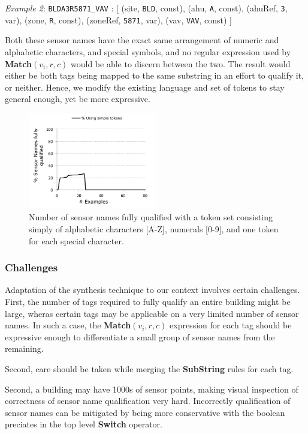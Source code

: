 {\it Example 2}: \texttt{BLDA3R5871\_VAV} : [ (site, \texttt{BLD}, const), (ahu, \texttt{A}, const), (ahuRef, \texttt{3}, var), (zone, \texttt{R}, const), (zoneRef, \texttt{5871}, var), (vav, \texttt{VAV}, const) ]

Both these sensor names have the exact same arrangement of numeric and alphabetic characters, and special symbols, and no regular expression used by {\bf Match}$(v_i,r,c)$  would be able to discern between the two. The result would either be both tags being mapped to the same substring in an effort to qualify it, or neither. Hence, we modify the existing language and set of tokens to stay general enough, yet be more expressive.

\begin{figure}[h!]
  
  \centering
    \includegraphics[width=0.5\textwidth]{figs/gulwani-noconverge.pdf}
\caption{Number of sensor names fully qualified with a token set consisting simply of alphabetic characters [A-Z], numerals [0-9], and one token for each special character.}
\label{fig:simpleTokenNoCoverage}
\end{figure}

\subsubsection{Challenges}

Adaptation of the synthesis technique to our context involves certain challenges. First, the number of tags required to fully qualify an entire building might be large, wheras certain tags may be applicable on a very limited number of sensor names. In such a case, the {\bf Match}$(v_i,r,c)$ expression for each tag should be expressive enough to differentiate a small group of sensor names from the remaining. 

Second, care should be taken while merging the {\bf SubString} rules for each tag. 

Second, a building may have 1000s of sensor points, making visual inspection of correctness of sensor name qualification very hard. Incorrectly qualification of sensor names can be mitigated by being more conservative with the boolean preciates in the top level {\bf Switch} operator. 

